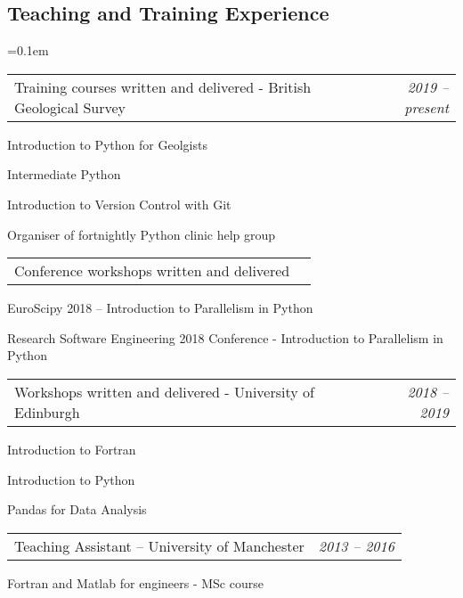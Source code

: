 \documentclass[10.5pt,a4]{article}
\makeatletter
\newcommand{\headerrow}[2]
{\begin{tabular*}{\linewidth}{l@{\extracolsep{\fill}}r}
	#1 &
	#2 \\
\end{tabular*}}
\makeatother
\begin{document}
\subsection*{Teaching and Training Experience} 
	\parskip=0.1em
\begin{itemize*}
	\item
	\headerrow
	{Training courses written and delivered - British Geological Survey}
	{\textit{2019 -- present}}
	  \begin{itemize*}
	  \item Introduction to Python for Geolgists
	  \item Intermediate Python
	  \item Introduction to Version Control with Git
	  \item Organiser of fortnightly Python clinic help group
	  \end{itemize*}
	  
	\item
	\headerrow
	{Conference workshops written and delivered}
	{}
	  \begin{itemize*}
	  \item EuroScipy 2018 -- Introduction to Parallelism in Python
	  \item Research Software Engineering 2018 Conference - Introduction to Parallelism in Python
	  \end{itemize*}

	\item
	\headerrow
	{Workshops written and delivered - University of Edinburgh}
	{\textit{2018 -- 2019}}
	  \begin{itemize*}
	  \item Introduction to Fortran
	  \item Introduction to Python
	  \item Pandas for Data Analysis
	  \end{itemize*}
	  


	\item
	\headerrow
	{Teaching Assistant -- University of Manchester}
	{\textit{2013 -- 2016}}
	  \begin{itemize*}
	  \item Fortran and Matlab for engineers - MSc course
	  \end{itemize*}
\end{itemize*}
\end{document}
